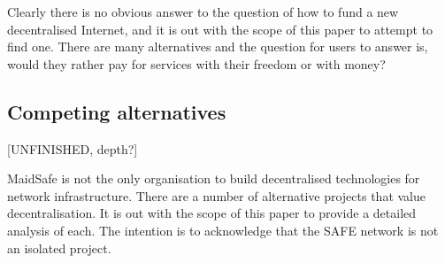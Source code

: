 \documentclass[twocolumn,english]{article}
\begin{document}
Clearly there is no obvious answer to the question of how to fund a new decentralised Internet, and it is out with the scope of this paper to attempt to find one. There are many alternatives and the question for users to answer is, would they rather pay for services with their freedom or with money?

%
%

\subsection{Competing alternatives}
[UNFINISHED, depth?]

MaidSafe is not the only organisation to build decentralised technologies for network infrastructure.  There are a number of alternative projects that value decentralisation. It is out with the scope of this paper to provide a detailed analysis of each.  The intention is to acknowledge that 
the SAFE network is not an isolated project. %
\end{document}
